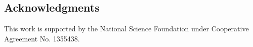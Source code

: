 \documentclass[rmp]{revtex4}
\begin{document}
\begin{spacing}{1.5}
\section*{Acknowledgments}

This work is supported by the National Science Foundation under Cooperative Agreement No. 1355438.




\end{spacing}
\end{document}

